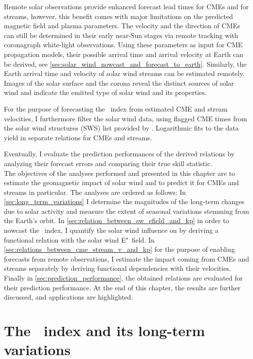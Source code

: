 Remote solar observations provide enhanced forecast lead times for CMEs and for streams, however, this benefit comes with major limitations on the predicted magnetic field and plasma parameters. The velocity and the direction of CMEs can still be determined in their early near-Sun stages via remote tracking with coronagraph white-light observations. Using these parameters as input for CME propagation models, their possible arrival time and arrival velocity at Earth can be derived, see \autoref{sec:solar_wind_nowcast_and_forecast_to_earth}. Similarly, the Earth arrival time and velocity of solar wind streams can be estimated remotely. Images of the solar surface and the corona reveal the distinct sources of solar wind and indicate the emitted type of solar wind and its properties.

For the purpose of forecasting the \Kp~index from estimated CME and stream velocities, I furthermore filter the solar wind data, using flagged CME times from the solar wind structures (SWS) list provided by \citet{Richardson2012}. Logarithmic fits to the data yield in separate \Kp{} relations for CMEs and streams.

Eventually, I evaluate the prediction performances of the derived relations by analyzing their forecast errors and comparing their true skill statistic.\\

The objectives of the analyses performed and presented in this chapter are to estimate the geomagnetic impact of solar wind and to predict it for CMEs and streams in particular. The analyses are ordered as follows: In \autoref{sec:long_term_variations} I determine the magnitudes of the long-term \Kp{} changes due to solar activity and measure the extent of seasonal variations stemming from the Earth's orbit. In \autoref{sec:relation_between_sw_efield_and_kp} in order to nowcast the \Kp{}~index, I quantify the solar wind influence on \Kp{} by deriving a functional relation with the solar wind E"~field. In \autoref{sec:relations_between_cme_stream_v_and_kp} for the purpose of enabling \Kp{} forecasts from remote observations, I estimate the \Kp{} impact coming from CMEs and streams separately by deriving functional dependencies with their velocities. Finally in \autoref{sec:prediction_performance}, the obtained \Kp{} relations are evaluated for their prediction performance. At the end of this chapter, the results are further discussed, and applications are highlighted.


\section{The \Kp{}~index and its long-term variations}
\label{sec:long_term_variations}

